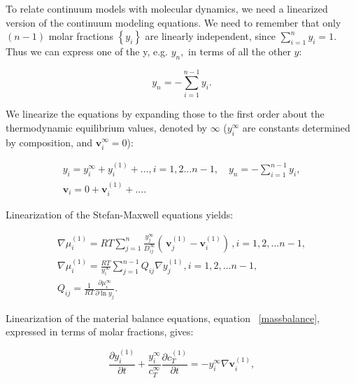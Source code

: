 \documentclass[../main.tex]{subfiles}
\begin{document}
To relate continuum models with molecular dynamics, we need a linearized version of the continuum modeling equations. We need to remember that only $(n-1)$  molar fractions $\left\{ y_i \right\}$ are linearly independent, since $\sum_{i=1}^{n} y_i =1.$ Thus we can express  one of the y, e.g. $y_n,$ in terms of all the other $y$:

\begin{equation}
    y_n = - \displaystyle\sum_{i=1}^{n-1} y_i.
\end{equation}

We linearize the equations by expanding those to the first order about the thermodynamic equilibrium values, denoted by $\infty$  ($y_i^\infty$ are constants determined by composition, and $\mathbf{v}_i^{\infty} = 0$):

\begin{equation} \begin{array}{l}
    y_i = y_i^\infty + y_i^{(1)}+ \ldots, i=1,2\ldots n-1, \quad y_n = - \displaystyle\sum_{i=1}^{n-1} y_i,
    \\
    \mathbf{v}_i = 0 + \mathbf{v}_i^{(1)} + \ldots .
\end{array} \end{equation}

\noindent Linearization of the Stefan-Maxwell equations yields:

\begin{equation} \begin{array}{l}
    \nabla \mu_i^{(1)} = RT \displaystyle \sum_{j=1}^{n} \frac{y_j^{\infty}}{D_{ij}^{\infty}} ( \, \mathbf{v}_j^{(1)} - \mathbf{v}_i^{(1)}) \, , i =1,2,\ldots n-1,
    \\
    \nabla \mu_i^{(1)} = \displaystyle \frac{RT}{y_i^{\infty}}\sum_{j=1}^{n-1} Q_{ij} \nabla  y_j^{(1)}  , i =1,2,\ldots n-1,
    \\
    Q_{ij} = \displaystyle \frac{1}{RT} \frac{\partial \mu_i^{\infty} }{\partial \ln y_j} .
    \label{linStefMax}
\end{array} \end{equation}

Linearization of the material balance equations, equation ~\ref{massbalance}, expressed in terms of molar fractions, gives:

\begin{equation}
    \displaystyle \frac{\partial  y_i^{(1)}}{\partial t} + \frac{ y_i^{\infty}}{c_T^{\infty} } \frac{\partial  c_T^{(1)}}{\partial t} = - y_i^{\infty}  \nabla \mathbf{v}_i^{(1)},
    \label{linmass}
\end{equation}
\end{document}
